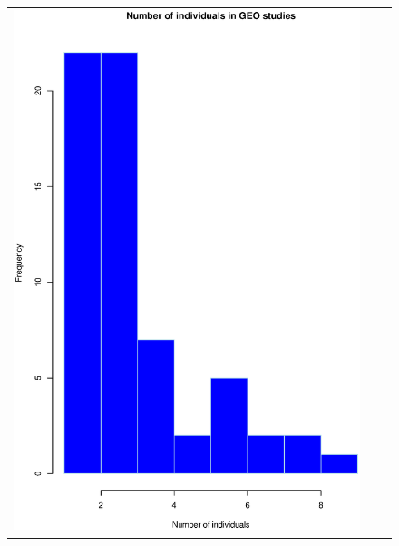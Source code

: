 \documentclass[a4paper]{article}
\begin{document}
\begin{figure}[h!]
\begin{tabular}{ccc}
\includegraphics[scale=0.24]{GEOind.eps} &

\end{tabular}
\end{figure}
\end{document}
